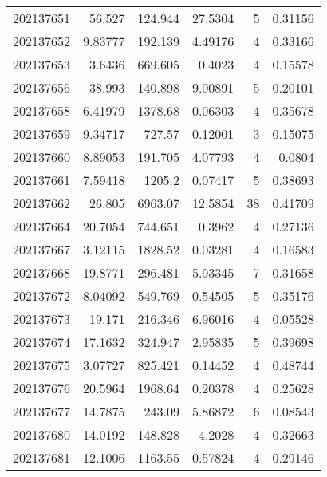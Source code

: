 \begin{tabular}{rrrrrr}
 202137651 &         56.527   &      124.944  &           27.5304  &           5 & 0.31156 \\
 202137652 &          9.83777 &      192.139  &            4.49176 &           4 & 0.33166 \\
 202137653 &          3.6436  &      669.605  &            0.4023  &           4 & 0.15578 \\
 202137656 &         38.993   &      140.898  &            9.00891 &           5 & 0.20101 \\
 202137658 &          6.41979 &     1378.68   &            0.06303 &           4 & 0.35678 \\
 202137659 &          9.34717 &      727.57   &            0.12001 &           3 & 0.15075 \\
 202137660 &          8.89053 &      191.705  &            4.07793 &           4 & 0.0804  \\
 202137661 &          7.59418 &     1205.2    &            0.07417 &           5 & 0.38693 \\
 202137662 &         26.805   &     6963.07   &           12.5854  &          38 & 0.41709 \\
 202137664 &         20.7054  &      744.651  &            0.3962  &           4 & 0.27136 \\
 202137667 &          3.12115 &     1828.52   &            0.03281 &           4 & 0.16583 \\
 202137668 &         19.8771  &      296.481  &            5.93345 &           7 & 0.31658 \\
 202137672 &          8.04092 &      549.769  &            0.54505 &           5 & 0.35176 \\
 202137673 &         19.171   &      216.346  &            6.96016 &           4 & 0.05528 \\
 202137674 &         17.1632  &      324.947  &            2.95835 &           5 & 0.39698 \\
 202137675 &          3.07727 &      825.421  &            0.14452 &           4 & 0.48744 \\
 202137676 &         20.5964  &     1968.64   &            0.20378 &           4 & 0.25628 \\
 202137677 &         14.7875  &      243.09   &            5.86872 &           6 & 0.08543 \\
 202137680 &         14.0192  &      148.828  &            4.2028  &           4 & 0.32663 \\
 202137681 &         12.1006  &     1163.55   &            0.57824 &           4 & 0.29146 \\

\end{tabular}

